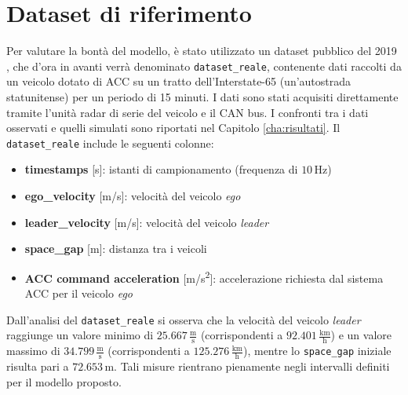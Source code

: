\section{Dataset di riferimento}
Per valutare la bontà del modello, è stato utilizzato un dataset pubblico del 2019 \cite{wang2019acc_dataset}, che d'ora in avanti
verrà denominato \texttt{dataset\_reale}, contenente dati raccolti da un veicolo dotato di ACC su un tratto dell'Interstate-65 
(un'autostrada statunitense) per un periodo di 15 minuti.  
I dati sono stati acquisiti direttamente tramite l'unità radar di serie del veicolo e il CAN bus.  
I confronti tra i dati osservati e quelli simulati sono riportati nel Capitolo \ref{cha:risultati}.
\clearpage
\noindent Il \texttt{dataset\_reale} include le seguenti colonne:
\begin{itemize}
    \item \textbf{timestamps} [s]: istanti di campionamento (frequenza di $10\,\mathrm{Hz}$)
    \item \textbf{ego\_velocity} [m/s]: velocità del veicolo \emph{ego}
    \item \textbf{leader\_velocity} [m/s]: velocità del veicolo \emph{leader}
    \item \textbf{space\_gap} [m]: distanza tra i veicoli
    \item \textbf{ACC command acceleration} [m/s\textsuperscript{2}]: accelerazione richiesta dal sistema ACC per il veicolo \emph{ego}
\end{itemize}

\noindent Dall'analisi del \texttt{dataset\_reale} si osserva che la velocità del veicolo \emph{leader} 
raggiunge un valore minimo di $25.667 \, \frac{\mathrm{m}}{\mathrm{s}}$ 
(corrispondenti a $92.401 \, \frac{\mathrm{km}}{\mathrm{h}}$) e un valore massimo di 
$34.799 \, \frac{\mathrm{m}}{\mathrm{s}}$ (corrispondenti a $125.276 \, \frac{\mathrm{km}}{\mathrm{h}}$), 
mentre lo \texttt{space\_gap} iniziale risulta pari a $72.653 \, \mathrm{m}$.  
Tali misure rientrano pienamente negli intervalli definiti per il modello proposto.

